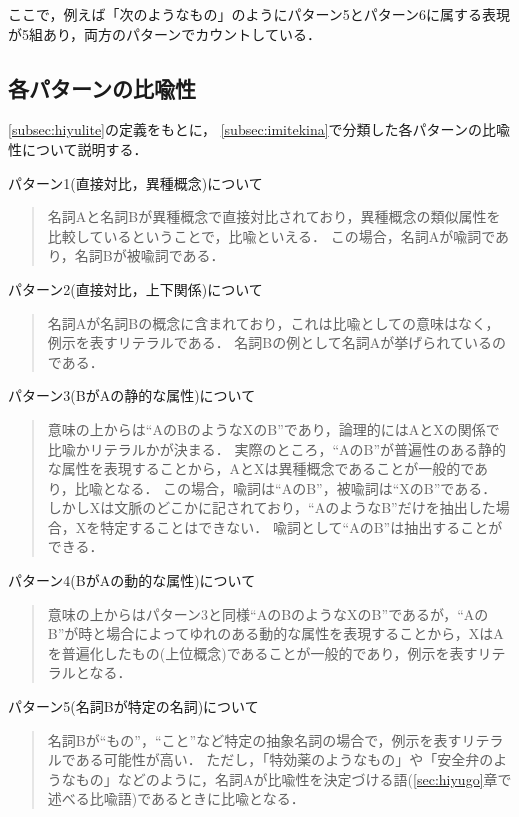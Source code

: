 \medskip
ここで，例えば「次のようなもの」のようにパターン5とパターン6に属する表現が5組あり，両方のパターンでカウントしている．

\subsection{各パターンの比喩性}\label{subsec:kakupata-n}

\ref{subsec:hiyulite}の定義をもとに，
\ref{subsec:imitekina}で分類した各パターンの比喩性について説明する．

\medskip
パターン1(直接対比，異種概念)について
\begin{quote}
名詞Aと名詞Bが異種概念で直接対比されており，異種概念の類似属性を比較しているということで，比喩といえる．
この場合，名詞Aが喩詞であり，名詞Bが被喩詞である．
\end{quote}

\medskip
パターン2(直接対比，上下関係)について
\begin{quote}
名詞Aが名詞Bの概念に含まれており，これは比喩としての意味はなく，例示を表すリテラルである．
名詞Bの例として名詞Aが挙げられているのである．
\end{quote}

\medskip
パターン3(BがAの静的な属性)について
\begin{quote}
意味の上からは``AのBのようなXのB''であり，論理的にはAとXの関係で比喩かリテラルかが決まる．
実際のところ，``AのB''が普遍性のある静的な属性を表現することから，AとXは異種概念であることが一般的であり，比喩となる．
この場合，喩詞は``AのB''，被喩詞は``XのB''である．
しかしXは文脈のどこかに記されており，``AのようなB''だけを抽出した場合，Xを特定することはできない．
喩詞として``AのB''は抽出することができる．
\end{quote}

\medskip
パターン4(BがAの動的な属性)について
\begin{quote}
意味の上からはパターン3と同様``AのBのようなXのB''であるが，``AのB''が時と場合によってゆれのある動的な属性を表現することから，XはAを普遍化したもの(上位概念)であることが一般的であり，例示を表すリテラルとなる．
\end{quote}

\medskip
パターン5(名詞Bが特定の名詞)について
\begin{quote}
名詞Bが``もの''，``こと''など特定の抽象名詞の場合で，例示を表すリテラルである可能性が高い．
ただし，「特効薬のようなもの」や「安全弁のようなもの」などのように，名詞Aが比喩性を決定づける語(\ref{sec:hiyugo}章で述べる比喩語)であるときに比喩となる．
\end{quote}

